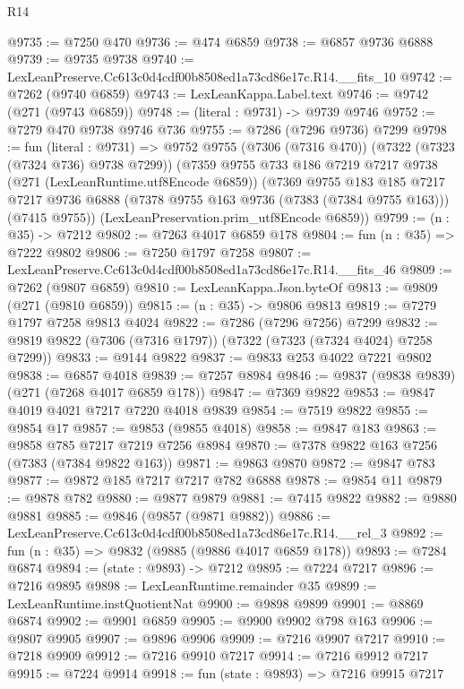 \begin{lexlean}{R14}
\begin{coremodule}
@9735 := @7250 @470
@9736 := @474 @6859
@9738 := @6857 @9736 @6888
@9739 := @9735 @9738
@9740 := LexLeanPreserve.Cc613c0d4cdf00b8508ed1a73cd86e17c.R14.__fits_10
@9742 := @7262 (@9740 @6859)
@9743 := LexLeanKappa.Label.text
@9746 := @9742 (@271 (@9743 @6859))
@9748 := (literal : @9731) -> @9739 @9746
@9752 := @7279 @470 @9738 @9746 @736
@9755 := @7286 (@7296 @9736) @7299
@9798 := fun (literal : @9731) =>
  @9752
    @9755
    (@7306 (@7316 @470))
    (@7322 (@7323 (@7324 @736) @9738 @7299))
    (@7359
      @9755
      @733
      @186
      @7219
      @7217
      @9738
      (@271 (LexLeanRuntime.utf8Encode @6859))
      (@7369
        @9755
        @183
        @185
        @7217
        @7217
        @9736
        @6888
        (@7378 @9755 @163 @9736 (@7383 (@7384 @9755 @163)))
        (@7415 @9755))
      (LexLeanPreservation.prim_utf8Encode @6859))
@9799 := (n : @35) -> @7212
@9802 := @7263 @4017 @6859 @178
@9804 := fun (n : @35) => @7222 @9802
@9806 := @7250 @1797 @7258
@9807 := LexLeanPreserve.Cc613c0d4cdf00b8508ed1a73cd86e17c.R14.__fits_46
@9809 := @7262 (@9807 @6859)
@9810 := LexLeanKappa.Json.byteOf
@9813 := @9809 (@271 (@9810 @6859))
@9815 := (n : @35) -> @9806 @9813
@9819 := @7279 @1797 @7258 @9813 @4024
@9822 := @7286 (@7296 @7256) @7299
@9832 := @9819 @9822 (@7306 (@7316 @1797)) (@7322 (@7323 (@7324 @4024) @7258 @7299))
@9833 := @9144 @9822
@9837 := @9833 @253 @4022 @7221 @9802
@9838 := @6857 @4018
@9839 := @7257 @8984
@9846 := @9837 (@9838 @9839) (@271 (@7268 @4017 @6859 @178))
@9847 := @7369 @9822
@9853 := @9847 @4019 @4021 @7217 @7220 @4018 @9839
@9854 := @7519 @9822
@9855 := @9854 @17
@9857 := @9853 (@9855 @4018)
@9858 := @9847 @183
@9863 := @9858 @785 @7217 @7219 @7256 @8984
@9870 := @7378 @9822 @163 @7256 (@7383 (@7384 @9822 @163))
@9871 := @9863 @9870
@9872 := @9847 @783
@9877 := @9872 @185 @7217 @7217 @782 @6888
@9878 := @9854 @11
@9879 := @9878 @782
@9880 := @9877 @9879
@9881 := @7415 @9822
@9882 := @9880 @9881
@9885 := @9846 (@9857 (@9871 @9882))
@9886 := LexLeanPreserve.Cc613c0d4cdf00b8508ed1a73cd86e17c.R14.__rel_3
@9892 := fun (n : @35) => @9832 (@9885 (@9886 @4017 @6859 @178))
@9893 := @7284 @6874
@9894 := (state : @9893) -> @7212
@9895 := @7224 @7217
@9896 := @7216 @9895
@9898 := LexLeanRuntime.remainder @35
@9899 := LexLeanRuntime.instQuotientNat
@9900 := @9898 @9899
@9901 := @8869 @6874
@9902 := @9901 @6859
@9905 := @9900 @9902 @798 @163
@9906 := @9807 @9905
@9907 := @9896 @9906
@9909 := @7216 @9907 @7217
@9910 := @7218 @9909
@9912 := @7216 @9910 @7217
@9914 := @7216 @9912 @7217
@9915 := @7224 @9914
@9918 := fun (state : @9893) => @7216 @9915 @7217

\end{coremodule}
\end{lexlean}
